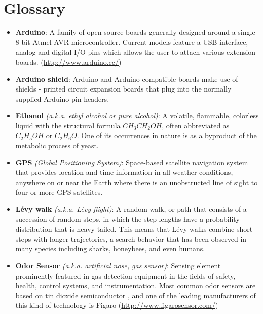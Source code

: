 \chapter{Glossary}

\begin{itemize}

\item{\textbf{Arduino}: A family of open-source boards generally designed around a single 8-bit Atmel AVR microcontroller. Current models feature a USB interface, analog and digital I/O pins which allows the user to attach various extension boards. (\url{http://www.arduino.cc/})}

\item{\textbf{Arduino shield}: Arduino and Arduino-compatible boards make use of shields - printed circuit expansion boards that plug into the normally supplied Arduino pin-headers.}

\item{\textbf{Ethanol} \emph{(a.k.a. ethyl alcohol or pure alcohol)}: A volatile, flammable, colorless liquid with the structural formula $CH_3CH_2OH$, often abbreviated as $C_2H_5OH$ or $C_2H_6O$. One of its occurrences in nature is as a byproduct of the metabolic process of yeast.}

\item{\textbf{GPS} \emph{(Global Positioning System)}: Space-based satellite navigation system that provides location and time information in all weather conditions, anywhere on or near the Earth where there is an unobstructed line of sight to four or more GPS satellites.}

\item{\textbf{L\'{e}vy walk} \emph{(a.k.a. L\'{e}vy flight)}: A random walk, or path that consists of a succession of random steps, in which the step-lengths have a probability distribution that is heavy-tailed. This means that L\'{e}vy walks combine short steps with longer trajectories, a search behavior that has been observed in many species including sharks, honeybees, and even humans.}

\item{\textbf{Odor Sensor} \emph{(a.k.a. artificial nose, gas sensor)}: Sensing element prominently featured in gas detection equipment in the fields of safety, health, control systems, and instrumentation. Most common odor sensors are based on tin dioxide semiconductor \cite{MillerBakrania06nanostructured}, and one of the leading manufacturers of this kind of technology is Figaro (\url{http://www.figarosensor.com/})}


\end{itemize}
